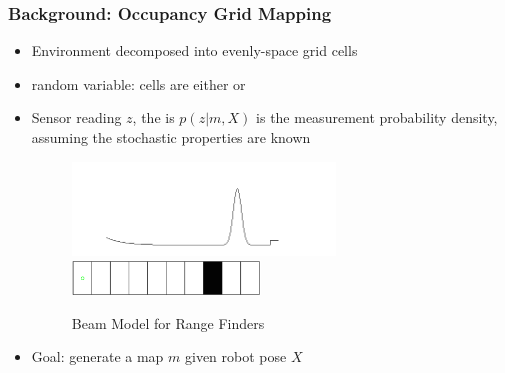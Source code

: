 \documentclass[11pt,professionalfonts,hyperref={pdftex,pdfpagemode=none,pdfstartview=FitH}]{beamer}
\renewcommand{\emph}[1]{\textit{\textbf{\color{blue}{#1}}}}
\begin{document}
\begin{frame}
\frametitle{Background: Occupancy Grid Mapping}
	\begin{itemize}
		\item Environment decomposed into evenly-space grid cells
		\item \emph{Binary} random variable: cells are either \emph{occupied} or \emph{free}
		\item Sensor reading $z$, the \emph{forward sensor model} is $p(z|m,X)$ is the measurement probability density, assuming the stochastic properties are known
		\begin{figure}[!htbp]
		\vspace*{-0.0cm}
		\centerline{
	  	  \includegraphics[width=7cm]{BeamModel.png}\hspace*{0.1cm}
	    	}
		\vspace*{0.25cm}
		\centerline{
	    	\includegraphics[width=5cm]{1D_True_Grid.png}\hspace*{0.1cm}
	    	}
		{Beam Model for Range Finders}
	\end{figure}
	    	\item Goal: generate a \emph{probabilistic} map $m$ given robot pose $X$
	\end{itemize}
\end{frame}
\end{document}
